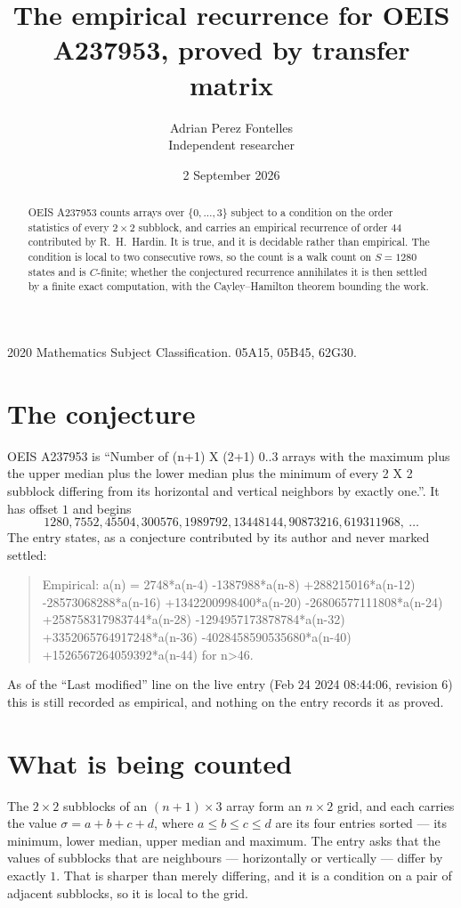 \documentclass[11pt,a4paper]{article}
\title{The empirical recurrence for OEIS A237953, proved by transfer matrix}
\author{Adrian Perez Fontelles\\ \small Independent researcher}
\date{2 September 2026}
\theoremstyle{plain}
\theoremstyle{definition}
\begin{document}
\maketitle

\begin{abstract}
OEIS A237953 counts arrays over $\{0,\dots,3\}$ subject to a condition on the order
statistics of every $2\times2$ subblock, and carries an empirical recurrence of order
$44$ contributed by R.~H.~Hardin. It is true, and it is decidable rather than empirical.
The condition is local to two consecutive rows, so the count is a walk count on $S=1280$
states and is $C$-finite; whether the conjectured recurrence annihilates it is then settled by
a finite exact computation, with the Cayley--Hamilton theorem bounding the work.
\end{abstract}

\noindent\small 2020 Mathematics Subject Classification. 05A15, 05B45, 62G30.\normalsize

\section{The conjecture}

OEIS A237953 is ``Number of (n+1) X (2+1) 0..3 arrays with the maximum plus the upper median plus the lower median plus the minimum of every 2 X 2 subblock differing from its horizontal and vertical neighbors by exactly one.''. It has offset $1$ and begins
\[
1280, 7552, 45504, 300576, 1989792, 13448144, 90873216, 619311968,\ \dots
\]
The entry states, as a conjecture contributed by its author and never marked settled:
\begin{quote}
Empirical: a(n) = 2748*a(n-4) -1387988*a(n-8) +288215016*a(n-12) -28573068288*a(n-16) +1342200998400*a(n-20) -26806577111808*a(n-24) +258758317983744*a(n-28) -1294957173878784*a(n-32) +3352065764917248*a(n-36) -4028458590535680*a(n-40) +1526567264059392*a(n-44) for n>46.
\end{quote}
As of the ``Last modified'' line on the live entry (Feb 24 2024 08:44:06, revision 6) this is still
recorded as empirical, and nothing on the entry records it as proved.

\section{What is being counted}

The $2\times2$ subblocks of an $(n+1)\times3$ array form an
$n\times2$ grid, and each carries the value $\sigma=a+b+c+d$, where $a\le b\le c\le d$ are its four entries sorted --- its minimum, lower median, upper median and maximum. The entry asks that the values of
subblocks that are neighbours --- horizontally or vertically --- differ by exactly $1$.
That is sharper than merely differing, and it is a condition on a pair of adjacent subblocks,
so it is local to the grid.
\end{document}
